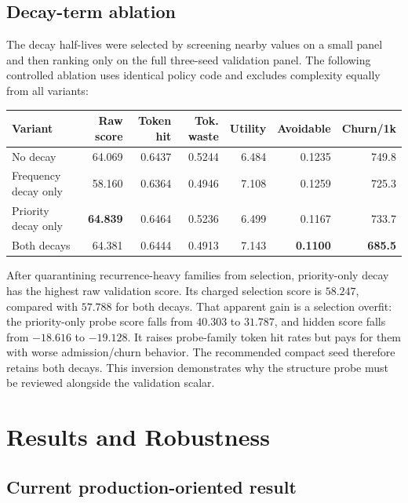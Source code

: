 \documentclass[11pt]{article}
\begin{document}
\subsection{Decay-term ablation}

The decay half-lives were selected by screening nearby values on a small panel and then
ranking only on the full three-seed validation panel.  The following controlled
ablation uses identical policy code and excludes complexity equally from all variants:

\begin{center}
\small
\begin{tabular}{lrrrrrr}
\toprule
\textbf{Variant} & \textbf{Raw score} & \textbf{Token hit} &
\textbf{Tok. waste} & \textbf{Utility} & \textbf{Avoidable} &
\textbf{Churn/1k} \\
\midrule
No decay & 64.069 & 0.6437 & 0.5244 & 6.484 & 0.1235 & 749.8 \\
Frequency decay only & 58.160 & 0.6364 & 0.4946 & 7.108 & 0.1259 & 725.3 \\
Priority decay only & \textbf{64.839} & 0.6464 & 0.5236 & 6.499 & 0.1167 & 733.7 \\
Both decays & 64.381 & 0.6444 & 0.4913 & 7.143 & \textbf{0.1100} & \textbf{685.5} \\
\bottomrule
\end{tabular}
\end{center}

After quarantining recurrence-heavy families from selection, priority-only decay has
the highest raw validation score.  Its charged selection score is \(58.247\), compared
with \(57.788\) for both decays.  That apparent gain is a selection overfit: the
priority-only probe score falls from \(40.303\) to \(31.787\), and hidden score falls
from \(-18.616\) to \(-19.128\).  It raises probe-family token hit rates but pays for
them with worse admission/churn behavior.  The recommended compact seed therefore
retains both decays.  This inversion demonstrates why the structure probe must be
reviewed alongside the validation scalar.

\section{Results and Robustness}

\subsection{Current production-oriented result}
\end{document}
